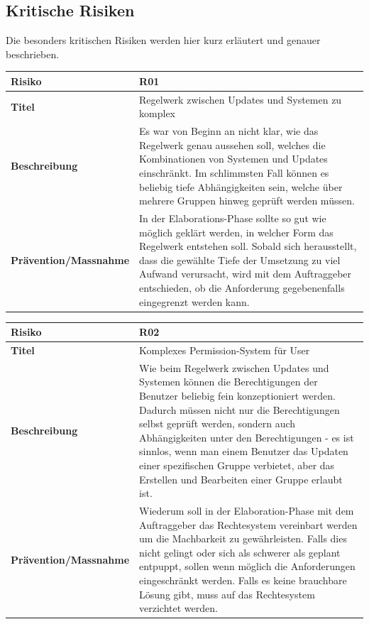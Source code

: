 \begin{landscape}

\end{landscape}

\subsection*{Kritische Risiken}

Die besonders kritischen Risiken werden hier kurz erläutert und genauer beschrieben.

\newcommand{\projectrisk}[4]{
	\begin{tabularx}{\linewidth}{lX}
		\toprule
		\textbf{Risiko} & #1\\
		\midrule
		\textbf{Titel} & #2\\
		\textbf{Beschreibung} & #3\\
		\textbf{Prävention/Massnahme} & #4\\
		\bottomrule
	\end{tabularx}
}


\projectrisk{R01}{Regelwerk zwischen Updates und Systemen zu komplex}
{Es war von Beginn an nicht klar, wie das Regelwerk genau aussehen soll, welches die Kombinationen von Systemen und Updates einschränkt. Im schlimmsten Fall können es beliebig tiefe Abhängigkeiten sein, welche über mehrere Gruppen hinweg geprüft werden müssen.}
{In der Elaborations-Phase sollte so gut wie möglich geklärt werden, in welcher Form das Regelwerk entstehen soll. Sobald sich herausstellt, dass die gewählte Tiefe der Umsetzung zu viel Aufwand verursacht, wird mit dem Auftraggeber entschieden, ob die Anforderung gegebenenfalls eingegrenzt werden kann.}


\projectrisk{R02}{Komplexes Permission-System für User}
{Wie beim Regelwerk zwischen Updates und Systemen können die Berechtigungen der Benutzer beliebig fein konzeptioniert werden. Dadurch müssen nicht nur die Berechtigungen selbst geprüft werden, sondern auch Abhängigkeiten unter den Berechtigungen - es ist sinnlos, wenn man einem Benutzer das Updaten einer spezifischen Gruppe verbietet, aber das Erstellen und Bearbeiten einer Gruppe erlaubt ist.}
{Wiederum soll in der Elaboration-Phase mit dem Auftraggeber das Rechtesystem vereinbart werden um die Machbarkeit zu gewährleisten. Falls dies nicht gelingt oder sich als schwerer als geplant entpuppt, sollen wenn möglich die Anforderungen eingeschränkt werden. Falls es keine brauchbare Lösung gibt, muss auf das Rechtesystem verzichtet werden.}


